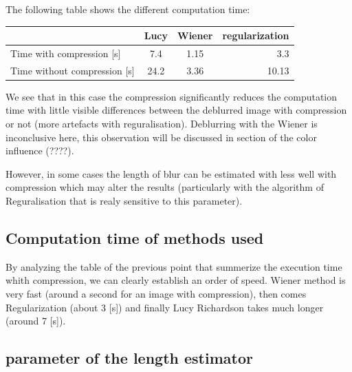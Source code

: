 
The following table shows the different computation time:

\begin{tabular}{|l|c|c|r|}
  \hline
  & Lucy &  Wiener & regularization \\
  \hline
  Time with compression [s] & 7.4 & 1.15 & 3.3 \\
  \hline
  Time without compression [s]  & 24.2 & 3.36 & 10.13 \\
  \hline
\end{tabular}


We see that in this case the compression significantly reduces the computation time with little visible differences between the deblurred image with compression or not (more artefacts with reguralisation). Deblurring with the Wiener is inconclusive here, this observation will be discussed in section of the color influence (????).

However, in some cases the length of blur can be estimated with less well with compression which may alter the results (particularly with the algorithm of Reguralisation that is realy sensitive to this parameter).

\subsection{Computation time of methods used}

By analyzing the table of the previous point that summerize the execution time whith compression, we can clearly establish an order of speed. Wiener method is very fast (around a second for an image with compression), then comes Regularization (about 3 [s]) and finally Lucy Richardson takes much longer (around 7 [s]).



\subsection{parameter of the length estimator}


